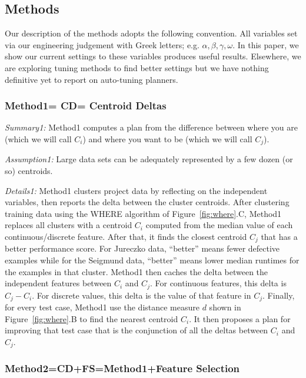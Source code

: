 \documentclass{sig-alternate}
\newcommand{\fig}[1]{Figure~\ref{fig:#1}}
\begin{document}
 \subsection{  Methods}

Our  description of the methods adopts the following convention. All variables
  set via  our engineering judgement  with Greek letters; e.g. $\alpha,\beta,\gamma,\omega$.
  In this paper, we show our current settings to these variables produces useful
  results. Elsewhere\cite{krall14,fu:ase15}, we are exploring tuning methods to 
  find better settings but  we have nothing definitive yet to report
  on auto-tuning planners.

\subsubsection{Method1= CD=   Centroid Deltas}


 {\em Summary1:} Method1  computes a plan from the difference between where you are  (which we will call $C_i$) and where you want to be  (which we will call $C_j$).

{\em Assumption1: } Large data sets can be adequately represented by a few dozen (or so) 
centroids.
 
 {\em Details1:} Method1 clusters project data by reflecting   on the independent variables, then
  reports the delta between the cluster centroids. 
  After clustering   training data using the WHERE algorithm of  \fig{where}.C, Method1
replaces all clusters with a  centroid $C_i$ computed from the median value of each
continuous/discrete feature. After that, it
finds the closest centroid $C_j$ that has a better
performance score. For Jureczko data, ``better'' means fewer defective examples while for the Seigmund data,
``better'' means lower median runtimes for the examples in that cluster.
Method1 then caches the  delta between the independent features between $C_i$ and $C_j$. For continuous
features, this delta is $C_j - C_i$. For discrete values, this delta is the value of that feature
in $C_j$. 
Finally, for every test case, Method1 use the distance measure $d$ shown in \fig{where}.B to find
the nearest centroid $C_i$.  It then proposes a plan for improving that test case
that is the conjunction of all the deltas between $C_i$ and $C_j$.


\subsubsection{Method2=CD+FS=Method1+Feature Selection }
 
\end{document}
